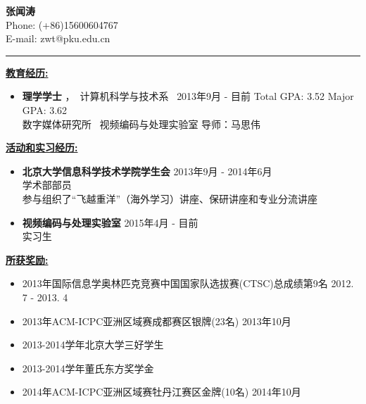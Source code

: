 \documentclass[UTF8]{ctexart}
\begin{document}
\begin{center}
  {\Huge \textbf{张闻涛}}\\
  \large{Phone: (+86)15600604767}\\
  \large{E-mail: zwt@pku.edu.cn} \\
\end{center}
  \rule[4pt]{18cm}{0.5pt}
  \smallskip
  {\large \textbf{\underline{教育经历:}}}\\
  \begin{itemize}
 \item \textbf{理学学士} ，\ 计算机科学与技术系 \ \qquad \hfill{2013年9月 - 目前}
   \smallskip
             \newline \hphantom{理学学士 \qquad } {\small Total GPA: 3.52 \qquad Major GPA: 3.62 } \\
	\smallskip
	\small 数字媒体研究所 \ 视频编码与处理实验室 \small 导师：马思伟


\end{itemize}

\medskip
{\large \textbf{\underline{活动和实习经历:}}}\\
\begin{itemize}
\item \textbf{北京大学信息科学技术学院学生会} \hfill{2013年9月 - 2014年6月}\\
\smallskip
{学术部部员} \\
\smallskip
\small{参与组织了“飞越重洋”（海外学习）讲座、保研讲座和专业分流讲座} 
\smallskip
\normalsize
\item \textbf{视频编码与处理实验室} \hfill{2015年4月 - 目前}\\
\smallskip
{实习生}\\
\end{itemize}

\medskip
{\large \textbf{\underline{所获奖励:}}}\\
\begin{itemize}
\item  2013年国际信息学奥林匹克竞赛中国国家队选拔赛(CTSC)总成绩第9名 \hfill{2012. 7 - 2013. 4}\\
\item  2013年ACM-ICPC亚洲区域赛成都赛区银牌(23名) \hfill{2013年10月}\\
\item  2013-2014学年北京大学三好学生 \\
\item  2013-2014学年董氏东方奖学金 \\
\item  2014年ACM-ICPC亚洲区域赛牡丹江赛区金牌(10名) \hfill{2014年10月}\\

\end{itemize}
\end{document}
